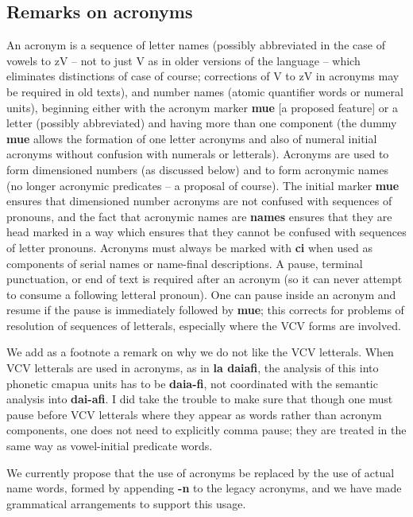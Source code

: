 \documentclass[12pt]{book}
\begin{document}
\subsection{Remarks on acronyms}

An acronym is a sequence of letter names (possibly abbreviated
in the case of vowels to zV -- not to just V as in older versions of the language -- which eliminates distinctions of case of course; corrections of V to zV in acronyms may be required in old texts), and number names (atomic quantifier words or numeral units), beginning either with the acronym marker {\bf mue} [a proposed feature] or a letter (possibly abbreviated)
and having more than one component (the dummy {\bf mue} allows the formation of one letter acronyms
and also of numeral initial acronyms without confusion with numerals or letterals).   Acronyms are used
to form dimensioned numbers (as discussed below) and to form acronymic names (no longer acronymic predicates -- a proposal of course).  The initial marker {\bf mue} ensures that dimensioned number acronyms are not confused with sequences of pronouns, and the fact that
acronymic names are {\bf names} ensures that they are head marked in a way which ensures that they cannot be confused with sequences of letter pronouns.  Acronyms must always be marked with {\bf ci} when used as components of serial names or name-final descriptions.  A pause, terminal punctuation, or end of text is required after an acronym (so it can never attempt to consume a following letteral pronoun).   One can pause inside an acronym and resume if the pause is immediately followed by {\bf mue}; this corrects for problems of resolution of sequences of letterals, especially where the VCV forms are involved.

We add as a footnote a remark on why we do not like the VCV letterals.  When  VCV letterals are used in acronyms, as in {\bf la daiafi}, the analysis of this into phonetic cmapua units has  to be {\bf daia-fi}, not coordinated with the semantic analysis into {\bf dai-afi}.   I did take the trouble to make sure
that though one must pause before VCV letterals where they appear as words rather than acronym components, one does not need to explicitly comma pause; they are treated in the same way as vowel-initial predicate words.

We currently propose that the use of acronyms be replaced by the use of actual name words, formed by appending {\bf -n} to the legacy acronyms, and we have made grammatical arrangements to support this usage.
\end{document}

